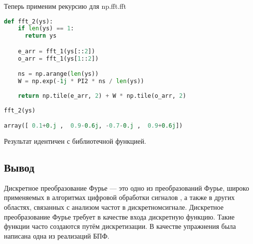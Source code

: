 Теперь применим рекурсию для np.fft.fft

\begin{lstlisting}[language=Python]
def fft_2(ys):
    if len(ys) == 1:
      return ys

    e_arr = fft_1(ys[::2])
    o_arr = fft_1(ys[1::2])

    ns = np.arange(len(ys))
    W = np.exp(-1j * PI2 * ns / len(ys))
    
    return np.tile(e_arr, 2) + W * np.tile(o_arr, 2)
    
fft_2(ys)

array([ 0.1+0.j ,  0.9-0.6j, -0.7-0.j ,  0.9+0.6j])
\end{lstlisting}

Результат идентичен с библиотечной функцией.

\subsection{Вывод}

Дискретное преобразование Фурье  — это одно из преобразований Фурье, широко применяемых в алгоритмах цифровой обработки сигналов , а также в других областях, связанных с анализом частот в дискретномсигнале. Дискретное преобразование Фурье требует в качестве входа дискретную функцию. Такие функции часто создаются путём дискретизации. В качестве упражнения была написана одна из реализаций БПФ.